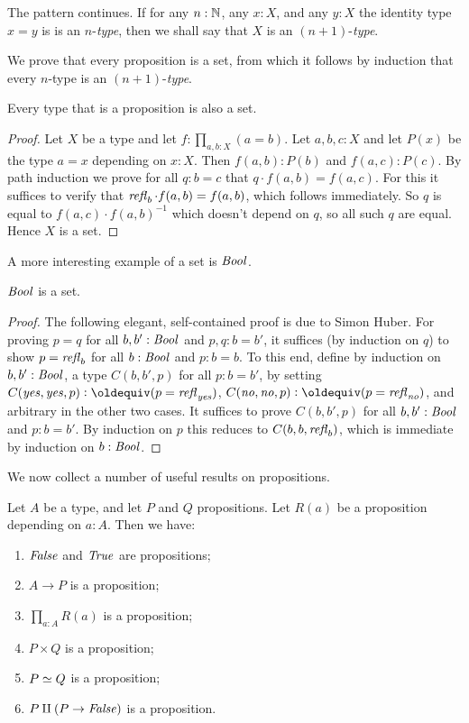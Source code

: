 The pattern continues.  If for any $n:\mathbb{N}$, any $x:X$, and any $y:X$ 
the identity type $x=y$ is is an $n$-\emph{type}, 
then we shall say that $X$ is an $(n+1)$-\emph{type}.

We prove that every proposition is a set, from which it follows
by induction that every $n$-type is an $(n+1)$-\emph{type}.

\begin{lemma}\label{lem:prop-is-set}
Every type that is a proposition is also a set.
\end{lemma}
\begin{proof}
Let $X$ be a type and let $f: \prod_{a,b:X} (a=b)$. Let $a,b,c : X$ and
let $P(x)$ be the type $a=x$ depending on $x:X$. Then
$f(a,b):P(b)$ and $f(a,c):P(c)$. By path induction we prove for
all $q:b=c$ that $q\cdot f(a,b) = f(a,c)$. For this it suffices to
verify that $\mathop{{\it refl}_{b}} \cdot f(a,b) = f(a,b)$, which follows immediately.
So $q$ is equal to $f(a,c)\cdot f(a,b)^{-1}$ which doesn't
depend on $q$, so all such $q$ are equal. Hence $X$ is a set.
\end{proof}

A more interesting example of a set is $\mathop{\mathit{Bool}}$.

\begin{lemma}\label{lem:isset-bool}
$\mathop{\mathit{Bool}}$ is a set.
\end{lemma}
\begin{proof}
The following elegant, self-contained proof is due to Simon Huber.
For proving $p=q$ for all $b,b':\mathop{\mathit{Bool}}$ and $p,q: b=b'$,
it suffices (by induction on $q$) to show
$p=\mathop{{\it refl}_{b}}$ for all $b:\mathop{\mathit{Bool}}$ and $p: b=b$.
To this end, define by induction on $b,b':\mathop{\mathit{Bool}}$,
a type $C(b,b',p)$ for all $p: b=b'$, by setting
$C(\yes,\yes,p)\defeq (p=\refl{\yes})$,
$C(\no,\no,p)\defeq (p=\refl{\no})$,
and arbitrary in the other two cases.
It suffices to prove $C(b,b',p)$ for all $b,b':\mathop{\mathit{Bool}}$
and $p: b=b'$. By induction on $p$ this reduces to
$C(b,b,\mathop{{\it refl}_{b}})$, which is immediate by induction on $b:\mathop{\mathit{Bool}}$.
\end{proof}

We now collect a number of useful results on propositions.

\begin{lemma}\label{lem:prop-utils}
Let $A$ be a type, and let $P$ and $Q$ propositions.
Let $R(a)$ be a proposition depending on $a:A$. Then we have:
\begin{enumerate}
\item\label{prop-utils-false-true} $\mathop{\mathit{False}}$ and $\mathop{\mathit{True}}$ are propositions;
\item\label{prop-utils-implication} $A\to P$ is a proposition;
\item\label{prop-utils-pi} $\prod_{a:A} R(a)$ is a proposition;
\item\label{prop-utils-times} $P\times Q$ is a proposition;
\item\label{prop-utils-eq} $P \simeq Q$ is a proposition;
\item\label{prop-utils-lem} $P \amalg (P\to\mathop{\mathit{False}})$ is a proposition.
\end{enumerate}
\end{lemma}

